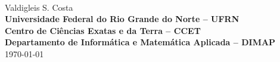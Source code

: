 \begingroup

\newpage
\thispagestyle{empty}


~\vfill

\printMyTitle

\begin{flushleft}
  {\LARGE Valdigleis S. Costa}\\
  {\normalsize\textbf{Universidade Federal do Rio Grande do Norte -- UFRN\\Centro de Ciências Exatas e da Terra -- CCET\\Departamento de Informática e Matemática Aplicada -- DIMAP}}\\
  {\scriptsize\today}
\end{flushleft}

~\vfill

\endgroup